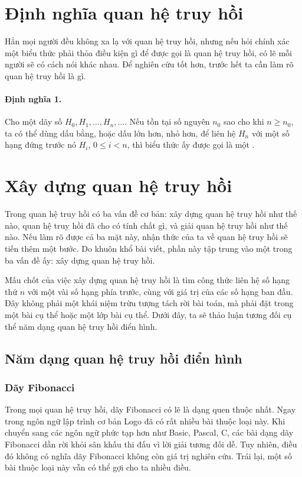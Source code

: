 \documentclass[11pt]{article}
\begin{document}
\section{Định nghĩa quan hệ truy hồi}

Hẳn mọi người đều không xa lạ với quan hệ truy hồi, nhưng nếu hỏi chính xác
một biểu thức phải thỏa điều kiện gì để được gọi là quan hệ truy hồi, có lẽ
mỗi người sẽ có cách nói khác nhau. Để nghiên cứu tốt hơn, trước hết ta cần
làm rõ quan hệ truy hồi là gì.

\paragraph{Định nghĩa 1.}
Cho một dãy số \(H_0,H_1,\ldots,H_n,\ldots\). Nếu tồn tại số nguyên \(n_0\)
sao cho khi \(n\ge n_0\), ta có thể dùng dấu bằng, hoặc dấu lớn hơn, nhỏ hơn,
để liên hệ \(H_n\) với một số hạng đứng trước nó \(H_i\), \(0\le i<n\), thì
biểu thức ấy được gọi là một .

\section{Xây dựng quan hệ truy hồi}

Trong quan hệ truy hồi có ba vấn đề cơ bản: xây dựng quan hệ truy hồi như thế
nào, quan hệ truy hồi đã cho có tính chất gì, và giải quan hệ truy hồi như
thế nào. Nếu làm rõ được cả ba mặt này, nhận thức của ta về quan hệ truy hồi
sẽ tiến thêm một bước. Do khuôn khổ bài viết, phần này tập trung vào một
trong ba vấn đề ấy: xây dựng quan hệ truy hồi.

Mấu chốt của việc xây dựng quan hệ truy hồi là tìm công thức liên hệ số hạng
thứ \(n\) với một vài số hạng phía trước, cùng với giá trị của các số hạng
ban đầu. Đây không phải một khái niệm trừu tượng tách rời bài toán, mà phải
đặt trong một bài cụ thể hoặc một lớp bài cụ thể. Dưới đây, ta sẽ thảo luận
tương đối cụ thể năm dạng quan hệ truy hồi điển hình.

\subsection{Năm dạng quan hệ truy hồi điển hình}

\subsubsection{Dãy Fibonacci}

Trong mọi quan hệ truy hồi, dãy Fibonacci có lẽ là dạng quen thuộc nhất. Ngay
trong ngôn ngữ lập trình cơ bản Logo đã có rất nhiều bài thuộc loại này. Khi
chuyển sang các ngôn ngữ phức tạp hơn như Basic, Pascal, C, các bài dạng dãy
Fibonacci dần rời khỏi sân khấu thi đấu vì lời giải tương đối dễ. Tuy nhiên,
điều đó không có nghĩa dãy Fibonacci không còn giá trị nghiên cứu. Trái lại,
một số bài thuộc loại này vẫn có thể gợi cho ta nhiều điều.
\end{document}
